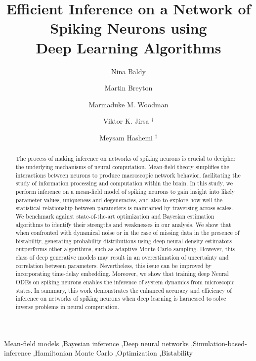 \documentclass[preprint,11pt,authoryear]{elsarticle}
\begin{document}
\begin{frontmatter}


\title{Efficient Inference on a Network of Spiking Neurons using \\Deep Learning Algorithms}



\rmfamily

\author[1]{Nina Baldy}
\author[2]{Martin Breyton}
\author[3]{Marmaduke M. Woodman}
\author[4]{Viktor K. Jirsa $^\dag$}
\author[5]{Meysam Hashemi $^\dag$\def\thefootnote{\dag}}


\address[1]{Aix Marseille Univ, INSERM, INS, Inst Neurosci Syst, Marseille, France}



\begin{abstract}

The process of making inference on networks of spiking neurons is crucial to decipher the underlying mechanisms of neural computation. Mean-field theory simplifies the interactions between neurons to produce macroscopic network behavior, facilitating the study of information processing and computation within the brain. In this study, we perform inference on a mean-field model of spiking neurons to gain insight into likely parameter values, uniqueness and degeneracies, and also to explore how well the statistical relationship between parameters is maintained by traversing across scales. We benchmark against state-of-the-art optimization and Bayesian estimation algorithms to identify their strengths and weaknesses in our analysis. We show that when confronted with dynamical noise or in the case of missing data in the presence of bistability, generating probability distributions using deep neural density estimators outperforms other algorithms, such as adaptive Monte Carlo sampling. However, this class of deep generative models may result in an overestimation of uncertainty and correlation between parameters. Nevertheless, this issue can be improved by incorporating time-delay embedding. Moreover, we show that training deep Neural ODEs on spiking neurons enables the inference of system dynamics from microscopic states. In summary, this work demonstrates the enhanced accuracy and efficiency of inference on networks of spiking neurons when deep learning is harnessed to solve inverse problems in neural computation.
\end{abstract}




\begin{keyword}
Mean-field models \sep Bayesian inference  \sep Deep neural networks  \sep Simulation-based-inference \sep Hamiltonian Monte Carlo  \sep Optimization  \sep Bistability
\end{keyword}

\end{frontmatter}
\end{document}
